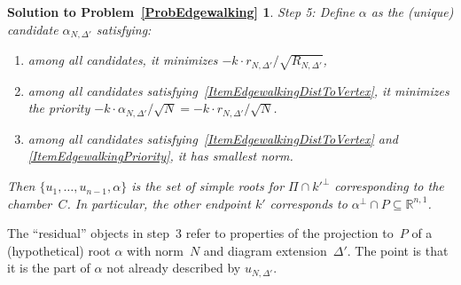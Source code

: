 \documentclass[12pt]{amsart}
\def\R{\mathbb{R}}
\def\sset{\subseteq}
\def\D{\Delta}
\numberwithin{theorem}{section}
\numberwithin{equation}{section}
\numberwithin{figure}{section}
\newtheorem*{SolutionToEdgewalking}{Solution to Problem~\ref{ProbEdgewalking}}
\theoremstyle{remark}
\begin{document}
\begin{SolutionToEdgewalking}
    \smallskip
    Step 5: Define $\alpha$ as the (unique) candidate $\alpha_{N,\D'}$ satisfying:
    \begin{enumerate}
        \item
            \label{ItemEdgewalkingDistToVertex}
    among all candidates, it minimizes $-k\cdot r_{N,\D'}/\sqrt{R_{N,\D'}}$,
    \item
        \label{ItemEdgewalkingPriority}
        among all candidates satisfying~\eqref{ItemEdgewalkingDistToVertex}, it minimizes
        the priority $-k\cdot \alpha_{N,\D'}/\sqrt{N}
            =-k\cdot r_{N,\D'}/\sqrt{N}$.
    \item
        \label{ItemEdgewalkingSmallestNorm}
        among all candidates satisfying~\eqref{ItemEdgewalkingDistToVertex} and \eqref{ItemEdgewalkingPriority}, it
            has smallest norm.
    \end{enumerate}
    Then $\{u_1,\dots,u_{n-1},\alpha\}$ is the set of
    simple roots for $\Pi\cap k'^\perp$ corresponding to the chamber~$C$.
    In particular,
    the other endpoint
    $k'$ corresponds to $\alpha^\perp\cap P\sset\R^{n,1}$.
\end{SolutionToEdgewalking}

    The ``residual'' objects in step~3
    refer to
    properties of the projection to~$P$ of a (hypothetical) root $\alpha$ with
    norm~$N$ and diagram extension~$\D'$.  The point is that it is the
    part of $\alpha$ not already described by $u_{N,\D'}$.  
\end{document}
